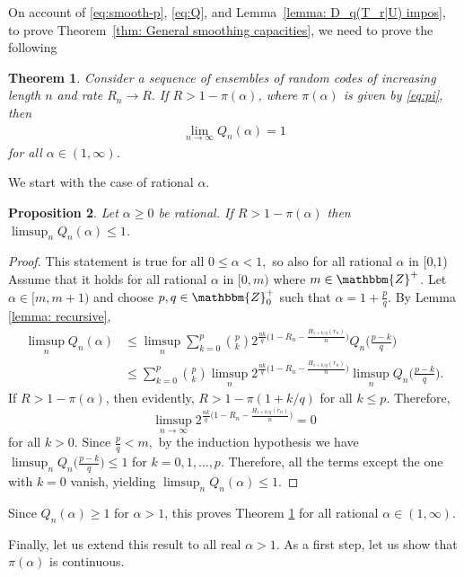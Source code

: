 \documentclass{amsart}
\newtheorem{theorem}{Theorem}[section]
\newtheorem{proposition}[theorem]{Proposition}
\theoremstyle{remark}
\begin{document}
On account of \eqref{eq:smooth-p}, \eqref{eq:Q}, and Lemma~\ref{lemma: D_q(T_r|U) impos}, to prove Theorem~\ref{thm: General smoothing capacities}, we need to prove the following
\begin{theorem}\label{thm: main} Consider a sequence of ensembles of random codes of increasing length $n$ and rate $R_n\to R.$
   If $R > 1-\pi(\alpha)$, where $\pi(\alpha)$ is given by \eqref{eq:pi}, then
   \begin{align}\label{eq: main}
       \lim_{n \to \infty}Q_n(\alpha) = 1
   \end{align}
   for all $\alpha \in (1,\infty)$. 
   \end{theorem}
We start with the case of rational $\alpha$.
\begin{proposition}   
    Let $\alpha\ge 0$ be rational. If $R > 1-\pi(\alpha)$ then $\limsup_nQ_n(\alpha) \leq 1$.
\end{proposition}
\begin{proof}
This statement is true for all $0\le\alpha<1,$ so also for all rational $\alpha$ in [0,1)
Assume that it holds for all rational $\alpha$ in $[0,m)$ where $m \in \mathbbm{Z}^{+}$.
    Let  $\alpha \in [m,m+1)$ and choose $p,q \in \mathbbm{Z}_{0}^{+}$ such that $\alpha = 1 + \frac{p}{q}$.  By Lemma \ref{lemma: recursive},
    \begin{align*}
        \limsup_nQ_n(\alpha) &\leq \limsup_n\sum_{k=0}^p \binom{p}{k} 2^{\frac{nk}{q}\big(1-R_n-\frac{H_{1+k/q}(r_n)}{n}\big)}Q_n\Big(\frac{p-k}{q}\Big)\\
        & \leq \sum_{k=0}^p \binom{p}{k} \limsup_n2^{\frac{nk}{q}\big(1-R_n-\frac{H_{1+k/q}(r_n)}{n}\big)}\limsup_n Q_n\Big(\frac{p-k}{q}\Big).
    \end{align*}
If $R > 1-\pi(\alpha)$, then evidently, $R > 1-\pi(1+k/q)$ for all $k\le p$. Therefore,  
  $$
  \limsup_{n \to \infty} 2^{\frac{nk}{q}\big(1-R_n-\frac{H_{1+k/q}(r_n)}{n}\big)} =0 
  $$
for all $k>0$. Since $\frac{p}{q}<m,$ by the induction hypothesis we have $ \limsup_n Q_n\big(\frac{p-k}
{q}\big) \leq 1$ for $k=0, 1, \dots, p$. Therefore, all the terms except the one with $k=0$ vanish, yielding $\limsup_n Q_n(\alpha) \leq 1$. 
\end{proof}

Since $Q_n(\alpha) \geq 1$ for $\alpha > 1$, this proves Theorem \ref{thm: main}
for all rational $\alpha \in (1, \infty).$

Finally, let us extend this result to all real $\alpha > 1$. As a first step, let us show that $\pi(\alpha)$ is continuous.
\end{document}
